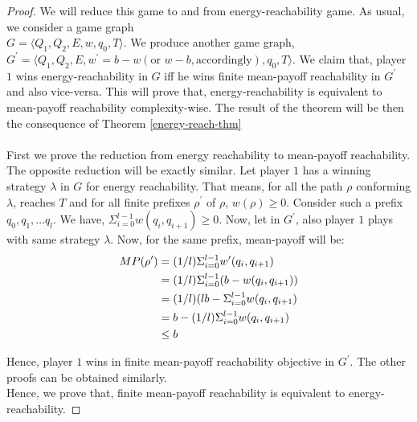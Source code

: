 \begin{proof}
We will reduce this game to and from energy-reachability game. As usual, we consider a game graph\\ $G=\langle Q_1, Q_2, E, w, q_0,T\rangle$. We produce another game graph, $G^{\prime}=\langle Q_1, Q_2, E, w^{\prime}= b-w (\text{or } w-b, \text{accordingly}), q_0,T\rangle$. We claim that, player $1$ wins energy-reachability in $G$ iff he wins finite mean-payoff reachability in $G^{\prime}$ and also vice-versa. This will prove that, energy-reachability is equivalent to mean-payoff reachability complexity-wise. The result of the theorem will be then the consequence of Theorem \ref{energy-reach-thm}\\
\\First we prove the reduction from energy reachability to mean-payoff reachability. The opposite reduction will be exactly similar. Let player $1$ has a winning strategy $\lambda$ in $G$ for energy reachability. That means, for all the path $\rho$ conforming $\lambda$, reaches $T$ and for all finite prefixes $\rho^{\prime}$ of $\rho$, $w(\rho)\geq 0$. Consider such a prefix $q_0,q_1,\ldots q_l$. We have, $\Sigma_{i=0}^{l-1} w(q_i,q_{i+1}) \geq 0$. Now, let in $G^{\prime}$, also player $1$ plays with same strategy $\lambda$. Now, for the same prefix, mean-payoff will be:
\begin{equation}
\begin{align*}
\notag
\centering
MP(\rho^{\prime})&= (1/l)\Sigma_{i=0}^{l-1} w^{\prime}(q_i,q_{i+1})\\
&=(1/l)\Sigma_{i=0}^{l-1} (b- w(q_i,q_{i+1}))\\
&=(1/l)(lb- \Sigma_{i=0}^{l-1} w(q_i,q_{i+1})\\
&=b- (1/l)\Sigma_{i=0}^{l-1} w(q_i,q_{i+1})\\
&\leq b
\end{align*}
\end{equation}

Hence, player $1$ wins in finite mean-payoff reachability objective in $G^{\prime}$. The other proofs can be obtained similarly.\\
Hence, we prove that, finite mean-payoff reachability is equivalent to energy-reachability.

\end{proof}


